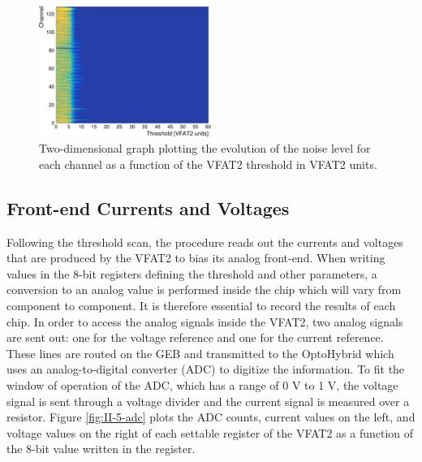       \begin{figure}[h!]
        \centering
        \includegraphics[width=0.5\textwidth]{img/plots/cThreshold_Channel-crop}
        \caption{Two-dimensional graph plotting the evolution of the noise level for each channel as a function of the VFAT2 threshold in VFAT2 units.}
        \label{fig:II-5-threshold}
      \end{figure}

    \subsection{Front-end Currents and Voltages}

      Following the threshold scan, the procedure reads out the currents and voltages that are produced by the VFAT2 to bias its analog front-end. When writing values in the 8-bit registers defining the threshold and other parameters, a conversion to an analog value is performed inside the chip which will vary from component to component. It is therefore essential to record the results of each chip. In order to access the analog signals inside the VFAT2, two analog signals are sent out: one for the voltage reference and one for the current reference. These lines are routed on the GEB and transmitted to the OptoHybrid which uses an analog-to-digital converter (ADC) to digitize the information. To fit the window of operation of the ADC, which has a range of 0 V to 1 V, the voltage signal is sent through a voltage divider and the current signal is measured over a resistor. Figure \ref{fig:II-5-adc} plots the ADC counts, current values on the left, and voltage values on the right of each settable register of the VFAT2 as a function of the 8-bit value written in the register. \\

